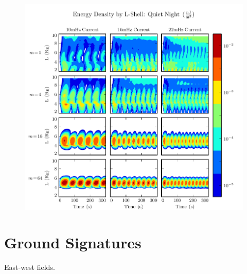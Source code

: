 \begin{figure}[H]
    \centering
    \includegraphics[width=\textwidth]{figures/ulayers_J_4.pdf}
    \caption[Energy Density by L-Shell: Quiet Night]{}
    \label{fig_ulayers_J_4}
\end{figure}


\section{Ground Signatures}

East-west fields. 

